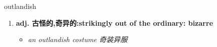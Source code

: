 
\begin{frame}
{\huge outlandish}
\begin{center}
\begin{enumerate}\Large
  \item \textbf{adj. 古怪的,奇异的:strikingly out of the ordinary: bizarre}
  \begin{itemize}
    \item \em{\Large{an outlandish costume 奇装异服}}
  \end{itemize}
\end{enumerate}
\end{center}
\end{frame}
